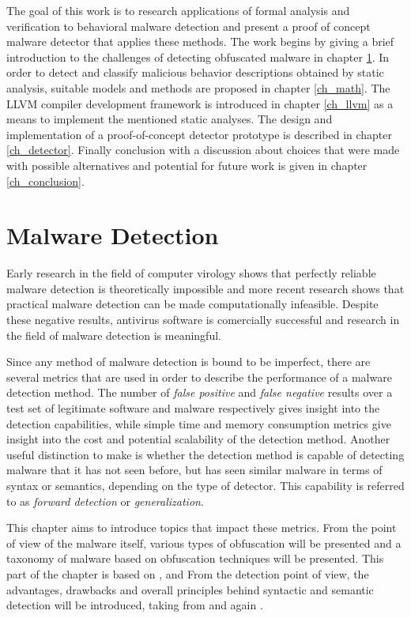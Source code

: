 The goal of this work is to research applications of formal analysis and verification to behavioral malware detection and present a proof of concept malware detector that applies these methods. The work begins by giving a brief introduction to the challenges of detecting obfuscated malware in chapter \ref{ch_malware}. In order to detect and classify malicious behavior descriptions obtained by static analysis, suitable models and methods are proposed in chapter \ref{ch_math}. The LLVM compiler development framework is introduced in chapter \ref{ch_llvm} as a means to implement the mentioned static analyses. The design and implementation of a proof-of-concept detector prototype is described in chapter \ref{ch_detector}. Finally conclusion with a discussion about choices that were made with possible alternatives and potential for future work is given in chapter \ref{ch_conclusion}.

\chapter{Malware Detection}
\label{ch_malware}
Early research in the field of computer virology shows that perfectly reliable malware detection is theoretically impossible\cite{Cohen86} and more recent research shows that practical malware detection can be made computationally infeasible\cite{Filiol12}. Despite these negative results, antivirus software is comercially successful and research in the field of malware detection is meaningful.

Since any method of malware detection is bound to be imperfect, there are several metrics that are used in order to describe the performance of a malware detection method. The number of \emph{false positive} and \emph{false negative} results over a test set of legitimate software and malware respectively gives insight into the detection capabilities, while simple time and memory consumption metrics give insight into the cost and potential scalability of the detection method. Another useful distinction to make is whether the detection method is capable of detecting malware that it has not seen before, but has seen similar malware in terms of syntax or semantics, depending on the type of detector. This capability is referred to as \emph{forward detection}\cite{Christo07} or \emph{generalization}\cite{Babic11}.

This chapter aims to introduce topics that impact these metrics. From the point of view of the malware itself, various types of obfuscation will be presented and a taxonomy of malware based on obfuscation techniques will be presented. This part of the chapter is based on \cite{You10}, \cite{Shiffman10} and \cite{Szor05} From the detection point of view, the advantages, drawbacks and overall principles behind syntactic and semantic detection will be introduced, taking from \cite{Jacob08} and again \cite{Szor05}.

